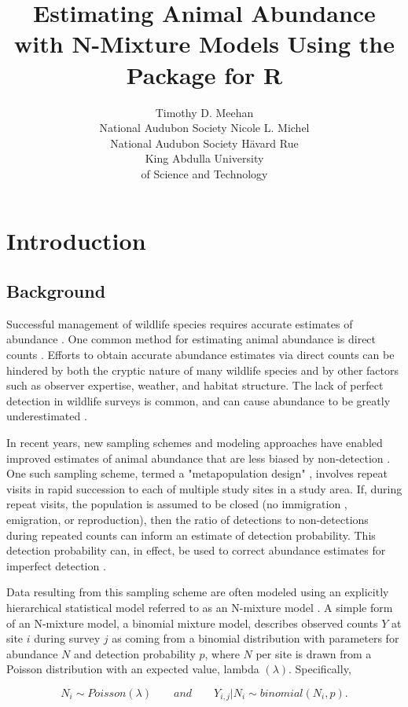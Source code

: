\documentclass[article]{jss}
\author{Timothy D. Meehan\\National Audubon Society \And
        Nicole L. Michel\\National Audubon Society \And
        H\"{a}vard Rue\\King Abdulla University\\of Science and Technology}
\title{Estimating Animal Abundance with N-Mixture Models Using the \pkg{R-INLA} Package for R}
\begin{document}
\section[Introduction]{Introduction}
\subsection[Background]{Background}
Successful management of wildlife species requires accurate estimates of abundance \citep{Yoccoz_Nichols_Boulinier_2001}.  One common method for estimating animal abundance is direct counts \citep{Pollock_Nichols_Simons_Farnsworth_Bailey_Sauer_2002}.  Efforts to obtain accurate abundance estimates via direct counts can be hindered by both the cryptic nature of many wildlife species and by other factors such as observer expertise, weather, and habitat structure.  The lack of perfect detection in wildlife surveys is common, and can cause abundance to be greatly underestimated \citep{Wenger_Freeman_2008, Joseph_Elkin_Martin_Possingham_2009}.

In recent years, new sampling schemes and modeling approaches have enabled improved estimates of animal abundance that are less biased by non-detection \citep{Denes_Silveira_Beissinger_2015}.  One such sampling scheme, termed a "metapopulation design" \citep{Kery_Royle_2010}, involves repeat visits in rapid succession to each of multiple study sites in a study area.  If, during repeat visits, the population is assumed to be closed (no immigration , emigration, or reproduction), then the ratio of detections to non-detections during repeated counts can inform an estimate of detection probability.  This detection probability can, in effect, be used to correct abundance estimates for imperfect detection \citep{Denes_Silveira_Beissinger_2015}.

Data resulting from this sampling scheme are often modeled using an explicitly hierarchical statistical model referred to as an N-mixture model \citep{Royle_Nichols_2003, Dodd_Dorazio_2004, Royle_2004, Kery_Royle_Schmid_2005}.  A simple form of an N-mixture model, a binomial mixture model, describes observed counts $Y$ at site $i$ during survey $j$ as coming from a binomial distribution with parameters for abundance $N$ and detection probability $p$, where $N$ per site is drawn from a Poisson distribution with an expected value, lambda $(\lambda)$. Specifically,

$$N_i \sim Poisson(\lambda) \qquad and \qquad  Y_{i,j} | N_i \sim binomial(N_i, p).$$
\end{document}
